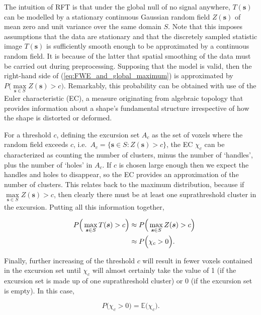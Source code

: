 The intuition of RFT is that under the global null of no signal anywhere, $T(\bm{s})$ can be modelled by a stationary continuous Gaussian random field $Z(\bm{s})$ of mean zero and unit variance over the same domain $S$. Note that this imposes assumptions that the data are stationary and that the discretely sampled statistic image $T(\bm{s})$ is sufficiently smooth enough to be approximated by a continuous random field. It is because of the latter that spatial smoothing of the data must be carried out during preprocessing.  Supposing that the model is valid, then the right-hand side of (\ref{eq:FWE_and_global_maximum}) is approximated by $P\Big(\max\limits_{\bm{s} \in S} Z(\bm{s}) > c \Big)$. Remarkably, this probability can be obtained with use of the Euler characteristic (EC), a measure originating from algebraic topology that provides information about a shape's fundamental structure irrespective of how the shape is distorted or deformed. 

For a threshold $c$, defining the excursion set $A_{c}$ as the set of voxels where the random field exceeds $c$, i.e.\ $A_{c} = \Big\{ \bm{s} \in S : Z(\bm{s}) > c \Big\}$, the EC $\chi_{c}$ can be characterized as counting the number of clusters, minus the number of `handles', plus the number of `holes' in $A_c$. If $c$ is chosen large enough then we expect the handles and holes to disappear, so the EC provides an approximation of the number of clusters. This relates back to the maximum distribution, because if $\max\limits_{\bm{s} \in S} Z(\bm{s}) > c$, then clearly there must be at least one suprathreshold cluster in the excursion. Putting all this information together,

\begin{alignat}{4}
\label{eq:prob_EC}
&&P\Big(\max\limits_{\bm{s} \in S} T(\bm{s}) > c \Big)
&\approx P\Big(\max\limits_{\bm{s} \in S} Z(\bm{s}) > c \Big) \notag\\
&
&
&\approx P\Big(\chi_{c} > 0\Big).
\end{alignat}

Finally, further increasing of the threshold $c$ will result in fewer voxels contained in the excursion set until $\chi_{c}$ will almost certainly take the value of 1 (if the excursion set is made up of one suprathreshold cluster) or 0 (if the excursion set is empty). In this case,

\begin{equation}
\label{eq:EC_high_threshold}
P\Big(\chi_{c} > 0\Big) = \mathbb{E}\Big(\chi_{c} \Big).
\end{equation}


